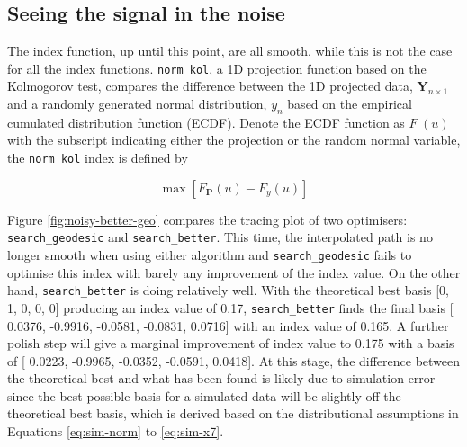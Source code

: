 \hypertarget{seeing-the-signal-in-the-noise}{%
\subsection{Seeing the signal in the
noise}\label{seeing-the-signal-in-the-noise}}

The index function, up until this point, are all smooth, while this is
not the case for all the index functions. \texttt{norm\_kol}, a 1D
projection function based on the Kolmogorov test, compares the
difference between the 1D projected data, \(\mathbf{Y}_{n \times 1}\)
and a randomly generated normal distribution, \(y_n\) based on the
empirical cumulated distribution function (ECDF). Denote the ECDF
function as \(F_{.}(u)\) with the subscript indicating either the
projection or the random normal variable, the \texttt{norm\_kol} index
is defined by

\[\max \left[F_{\mathbf{P}}(u) - F_{y}(u)\right]\]

Figure \ref{fig:noisy-better-geo} compares the tracing plot of two
optimisers: \texttt{search\_geodesic} and \texttt{search\_better}. This
time, the interpolated path is no longer smooth when using either
algorithm and \texttt{search\_geodesic} fails to optimise this index
with barely any improvement of the index value. On the other hand,
\texttt{search\_better} is doing relatively well. With the theoretical
best basis {[}0, 1, 0, 0, 0{]} producing an index value of 0.17,
\texttt{search\_better} finds the final basis {[} 0.0376, -0.9916,
-0.0581, -0.0831, 0.0716{]} with an index value of 0.165. A further
polish step will give a marginal improvement of index value to 0.175
with a basis of {[} 0.0223, -0.9965, -0.0352, -0.0591, 0.0418{]}. At
this stage, the difference between the theoretical best and what has
been found is likely due to simulation error since the best possible
basis for a simulated data will be slightly off the theoretical best
basis, which is derived based on the distributional assumptions in
Equations \ref{eq:sim-norm} to \ref{eq:sim-x7}.

